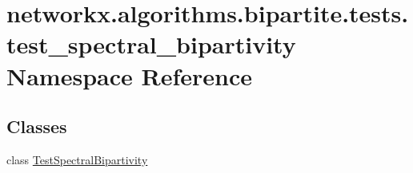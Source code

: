 \hypertarget{namespacenetworkx_1_1algorithms_1_1bipartite_1_1tests_1_1test__spectral__bipartivity}{}\section{networkx.\+algorithms.\+bipartite.\+tests.\+test\+\_\+spectral\+\_\+bipartivity Namespace Reference}
\label{namespacenetworkx_1_1algorithms_1_1bipartite_1_1tests_1_1test__spectral__bipartivity}
\subsection*{Classes}
\begin{DoxyCompactItemize}
\item 
class \hyperlink{classnetworkx_1_1algorithms_1_1bipartite_1_1tests_1_1test__spectral__bipartivity_1_1TestSpectralBipartivity}{Test\+Spectral\+Bipartivity}
\end{DoxyCompactItemize}
